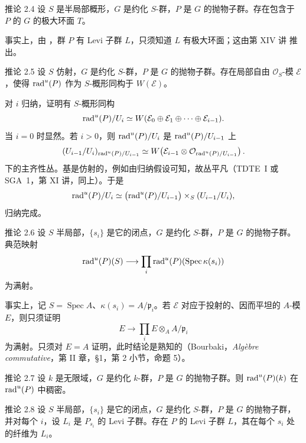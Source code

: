 \begin{sgastatement}{推论 2.4}
设 \(S\) 是半局部概形，\(G\) 是约化 \(S\)-群，\(P\) 是 \(G\) 的抛物子群。存在包含于 \(P\) 的 \(G\) 的极大环面 \(T\)。
\end{sgastatement}

事实上，由 ，群 \(P\) 有 Levi 子群 \(L\)，只须知道 \(L\) 有极大环面；这由第 XIV 讲  推出。

\begin{sgastatement}{推论 2.5}
设 \(S\) 仿射，\(G\) 是约化 \(S\)-群，\(P\) 是 \(G\) 的抛物子群。存在局部自由 \(\mathcal O_S\)-模 \(\mathcal E\)，使得 \(\operatorname{rad}^u(P)\) 作为 \(S\)-概形同构于 \(W(\mathcal E)\)。
\end{sgastatement}

对 \(i\) 归纳，证明有 \(S\)-概形同构
\[
 \operatorname{rad}^u(P)/U_i
 \simeq
 W(\mathcal E_0\oplus\mathcal E_1\oplus\cdots\oplus\mathcal E_{i-1}).
\]
当 \(i=0\) 时显然。若 \(i>0\)，则 \(\operatorname{rad}^u(P)/U_i\) 是 \(\operatorname{rad}^u(P)/U_{i-1}\) 上
\[
 (U_{i-1}/U_i)_{\operatorname{rad}^u(P)/U_{i-1}}
 \simeq
 W\!\left(
 \mathcal E_{i-1}\otimes
 \mathcal O_{\operatorname{rad}^u(P)/U_{i-1}}
 \right).
\]
下的主齐性丛。基是仿射的，例如由归纳假设可知，故丛平凡（TDTE~I 或 SGA~1，第 XI 讲，同上）。于是
\[
 \operatorname{rad}^u(P)/U_i
 \simeq
 \bigl(\operatorname{rad}^u(P)/U_{i-1}\bigr)\times_S(U_{i-1}/U_i),
\]
归纳完成。

\begin{sgastatement}{推论 2.6}
设 \(S\) 半局部，\(\{s_i\}\) 是它的闭点，\(G\) 是约化 \(S\)-群，\(P\) 是 \(G\) 的抛物子群。典范映射
\[
 \operatorname{rad}^u(P)(S)\longrightarrow
 \prod_i\operatorname{rad}^u(P)(\operatorname{Spec}\kappa(s_i))
\]
为满射。
\end{sgastatement}

事实上，记 \(S=\operatorname{Spec}A\)、\(\kappa(s_i)=A/\mathfrak p_i\)。若 \(\mathcal E\) 对应于投射的、因而平坦的 \(A\)-模 \(E\)，则只须证明
\[
 E\longrightarrow\prod_i E\otimes_A A/\mathfrak p_i
\]
为满射。只须对 \(E=A\) 证明，此时结论是熟知的（Bourbaki，\emph{Algèbre commutative}，第 II 章，\S1，第 2 小节，命题 5）。

\begin{sgastatement}{推论 2.7}
设 \(k\) 是无限域，\(G\) 是约化 \(k\)-群，\(P\) 是 \(G\) 的抛物子群。则 \(\operatorname{rad}^u(P)(k)\) 在 \(\operatorname{rad}^u(P)\) 中稠密。
\end{sgastatement}

\begin{sgastatement}{推论 2.8}
设 \(S\) 半局部，\(\{s_i\}\) 是它的闭点，\(G\) 是约化 \(S\)-群，\(P\) 是 \(G\) 的抛物子群，并对每个 \(i\)，设 \(L_i\) 是 \(P_{s_i}\) 的 Levi 子群。存在 \(P\) 的 Levi 子群 \(L\)，其在每个 \(s_i\) 处的纤维为 \(L_i\)。
\end{sgastatement}

